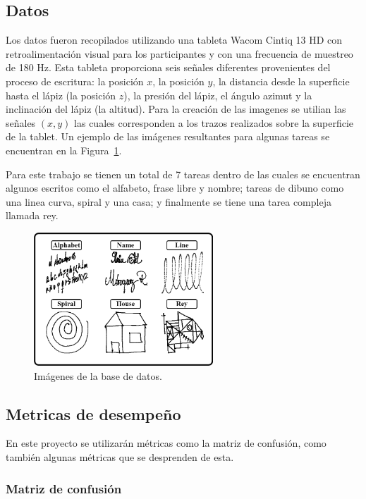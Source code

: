 \documentclass[10pt, a4paper]{article}
\begin{document}
\subsection*{Datos}

Los datos fueron recopilados utilizando una tableta Wacom Cintiq 13 HD con retroalimentación visual 
para los participantes y con una frecuencia de muestreo de 180 Hz. Esta tableta proporciona seis 
señales diferentes provenientes del proceso de escritura: la posición $x$, la posición $y$, la distancia 
desde la superficie hasta el lápiz (la posición $z$), la presión del lápiz, el ángulo azimut y la 
inclinación del lápiz (la altitud). Para la creación de las imagenes se utilian las señales $(x,y)$
las cuales corresponden a los trazos realizados sobre la superficie de la tablet. Un ejemplo de las
imágenes resultantes para algunas tareas se encuentran en la Figura~\ref{fig:db_images}.

Para este trabajo se tienen un total de 7 tareas dentro de las cuales se encuentran algunos escritos 
como el alfabeto, frase libre y nombre; tareas de dibuno como una linea curva, spiral y una casa; y 
finalmente se tiene una tarea compleja llamada rey. 


\begin{figure}
    \centering
    \includegraphics[width=0.6\textwidth]{images/HW_Tasks.png}
    \caption{Imágenes de la base de datos.}
    \label{fig:db_images}
\end{figure}


\subsection*{Metricas de desempeño}

En este proyecto se utilizarán métricas como la matriz de confusión, como también algunas 
métricas que se desprenden de esta. 

\subsubsection*{Matriz de confusión}
\end{document}
